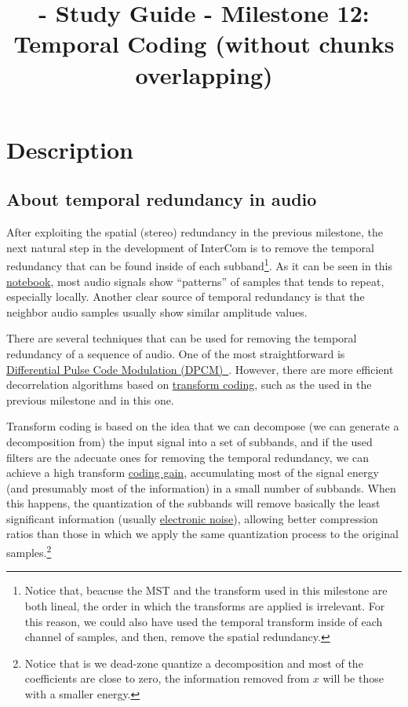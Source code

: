 
\title{\TM{} - Study Guide - Milestone 12: Temporal Coding (without chunks overlapping)}

\maketitle

\section{Description}

\subsection{About temporal redundancy in audio}
After exploiting the spatial (stereo) redundancy in the previous
milestone, the next natural step in the development of InterCom is to
remove the temporal redundancy that can be found inside of each
subband\footnote{Notice that, beacuse the MST and the transform used
  in this milestone are both lineal, the order in which the transforms
  are applied is irrelevant. For this reason, we could also have used
  the temporal transform inside of each channel of samples, and then,
  remove the spatial redundancy.}. As it can be seen in this
\href{https://github.com/Tecnologias-multimedia/intercom/blob/master/docs/audio_viewer.ipynb}{notebook},
most audio signals show ``patterns'' of samples that tends to repeat,
especially locally. Another clear source of temporal redundancy is
that the neighbor audio samples usually show similar amplitude values.

There are several techniques that can be used for removing the
temporal redundancy of a sequence of audio. One of the most
straightforward is
\href{https://en.wikipedia.org/wiki/Differential_pulse-code_modulation}{Differential
  Pulse Code Modulation
  (DPCM)~\cite{sayood2017introduction}}. However, there are more
efficient decorrelation algorithms based on
\href{https://en.wikipedia.org/wiki/Transform_coding}{transform
  coding}, such as the used in the previous milestone and in this one.

Transform coding is based on the idea that we can decompose (we can
generate a decomposition from) the input signal into a set of
subbands, and if the used filters are the adecuate ones for removing
the temporal redundancy, we can achieve a high transform
\href{https://en.wikipedia.org/wiki/Coding_gain}{coding gain},
accumulating most of the signal energy (and presumably most of the
information) in a small number of subbands. When this happens, the
quantization of the subbands will remove basically the least
significant information (usually
\href{https://en.wikipedia.org/wiki/Noise_(electronics)}{electronic
  noise}), allowing better compression ratios than those in which we
apply the same quantization process to the original
samples.\footnote{Notice that is we dead-zone quantize a decomposition
and most of the coefficients are close to zero, the information
removed from $x$ will be those with a smaller energy.}


